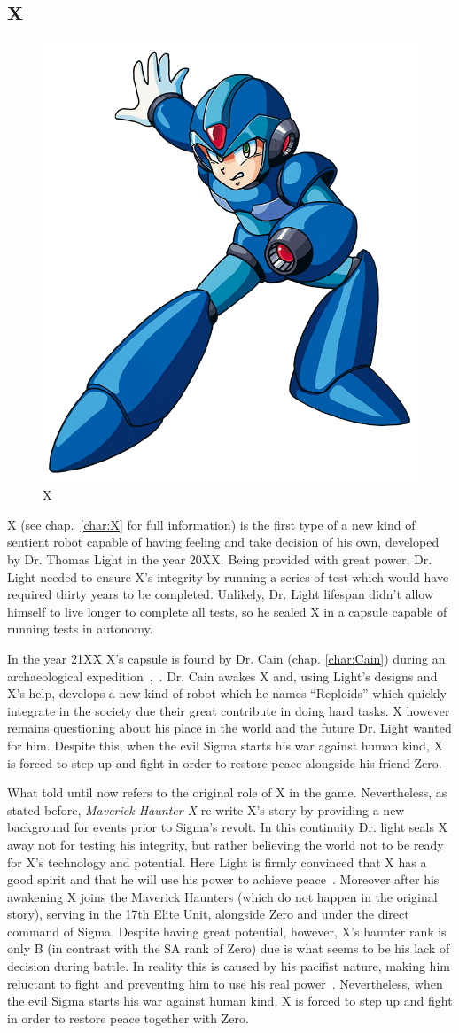 \subsection{X}
\begin{figure}[htp]
	\centering
	\includegraphics[width=0.3\linewidth]{figures/X1/X_X1.png}
	\caption{X}
\end{figure}
X (see chap.~\ref{char:X} for full information) is the first type of a new kind of sentient robot capable of having feeling and take decision of his own, developed by Dr. Thomas Light in the year 20XX. Being provided with great power, Dr. Light needed to ensure X's integrity by running a series of test which would have required thirty years to be completed. Unlikely, Dr. Light lifespan didn't allow himself to live longer to complete all tests, so he sealed X in a capsule capable of running tests in autonomy.

In the year 21XX X's capsule is found by Dr. Cain (chap. \ref{char:Cain}) during an archaeological expedition~\cite{X:Manual},~\cite{wiki:Cain_journal}. Dr. Cain awakes X and, using Light's designs and X's help, develops a new kind of robot  which he names ``Reploids'' which quickly integrate in the society due their great contribute in doing hard tasks. X however remains questioning about his place in the world and the future Dr. Light wanted for him. Despite this, when the evil Sigma starts his war against human kind, X is forced to step up and fight in order to restore peace alongside his friend Zero. 

What told until now refers to the original role of X in the \x game. Nevertheless, as stated before, \textit{Maverick Haunter X} re-write X's story by providing a new background for events prior to Sigma's revolt. In this continuity Dr. light seals X away not for testing his integrity, but rather believing the world not to be ready for X's technology and potential. Here Light is firmly convinced that X has a good spirit and that he will use his power to achieve peace~\cite{wiki:MM_MHX_X}. Moreover after his awakening X joins the Maverick Haunters (which do not happen in the original story), serving in the 17th Elite Unit, alongside Zero and under the direct command of Sigma. Despite having great potential, however, X's haunter rank is only B (in contrast with the SA rank of Zero) due is what seems to be his lack of decision during battle. In reality this is caused by his pacifist nature, making him reluctant to fight and preventing him to use his real power~\cite{Xcoll1:Manual_X1}. Nevertheless, when the evil Sigma starts his war against human kind, X is forced to step up and fight in order to restore peace together with Zero.

